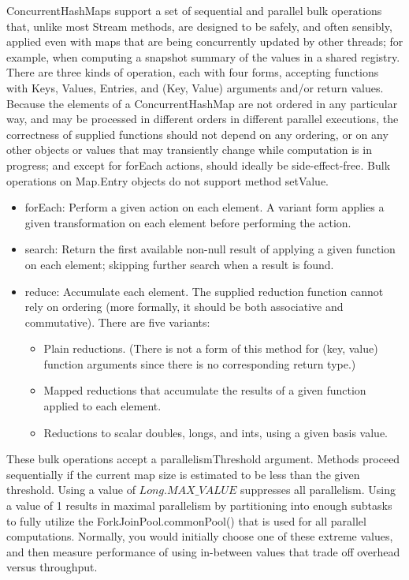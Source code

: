 \documentclass[UTF8,11pt]{ctexbook}
\newenvironment{myitemize}
{ \begin{itemize}
		\setlength{\itemsep}{0pt}
		\setlength{\parskip}{0pt}
		\setlength{\parsep}{0pt}     }
	{ \end{itemize}                  }
\begin{document}
	ConcurrentHashMaps support a set of sequential and parallel bulk operations that, unlike most Stream methods, are designed to be safely, and often sensibly, applied even with maps that are being concurrently updated by other threads; for example, when computing a snapshot summary of the values in a shared registry. There are three kinds of operation, each with four forms, accepting functions with Keys, Values, Entries, and (Key, Value) arguments and/or return values. Because the elements of a ConcurrentHashMap are not ordered in any particular way, and may be processed in different orders in different parallel executions, the correctness of supplied functions should not depend on any ordering, or on any other objects or values that may transiently change while computation is in progress; and except for forEach actions, should ideally be side-effect-free. Bulk operations on Map.Entry objects do not support method setValue.
	
	\begin{myitemize}
		\item forEach: Perform a given action on each element. A variant form applies a given transformation on each element before performing the action.
		
		\item search: Return the first available non-null result of applying a given function on each element; skipping further search when a result is found.
		
		\item reduce: Accumulate each element. The supplied reduction function cannot rely on ordering (more formally, it should be both associative and commutative). There are five variants:
				\begin{myitemize}
					\item Plain reductions. (There is not a form of this method for (key, value) function arguments since there is no corresponding return type.)
					\item Mapped reductions that accumulate the results of a given function applied to each element.
					\item Reductions to scalar doubles, longs, and ints, using a given basis value.
				\end{myitemize}
	\end{myitemize}  
	
	These bulk operations accept a parallelismThreshold argument. Methods proceed sequentially if the current map size is estimated to be less than the given threshold. Using a value of $Long.MAX\_VALUE$ suppresses all parallelism. Using a value of 1 results in maximal parallelism by partitioning into enough subtasks to fully utilize the ForkJoinPool.commonPool() that is used for all parallel computations. Normally, you would initially choose one of these extreme values, and then measure performance of using in-between values that trade off overhead versus throughput.\\
	
\end{document}
